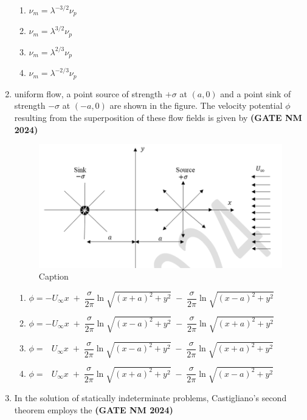 \documentclass[journal,15pt,onecolumn]{IEEEtran}
\theoremstyle{remark}
\begin{document}
\begin{enumerate}
    \begin{enumerate}
        \item $\nu_m = \lambda^{-3/2} \nu_p$
        \item $\nu_m = \lambda^{3/2} \nu_p$
        \item $\nu_m = \lambda^{2/3} \nu_p$
        \item $\nu_m = \lambda^{-2/3} \nu_p$
    \end{enumerate}
    
 \item
 uniform flow, a point source of strength $+\sigma$ at $(a,0)$ and a point sink of
  strength $-\sigma$ at $(-a,0)$ are shown in the figure. The velocity potential $\phi$
  resulting from the superposition of these flow fields is given by\hfill \textbf{ (GATE NM 2024)}

\begin{figure}
    \centering
    \includegraphics[width=0.5\linewidth]{figures.tex/Screenshot 2025-08-22 150107.png}
    \caption{Caption}
    \label{fig:placeholder}
\end{figure}
  
  \begin{enumerate}
    \item $\phi = -U_{\infty} x \;+\; \dfrac{\sigma}{2\pi}\ln\!\sqrt{(x+a)^2+y^2}
                \;-\; \dfrac{\sigma}{2\pi}\ln\!\sqrt{(x-a)^2+y^2}$
    \item $\phi = -U_{\infty} x \;+\; \dfrac{\sigma}{2\pi}\ln\!\sqrt{(x-a)^2+y^2}
                \;-\; \dfrac{\sigma}{2\pi}\ln\!\sqrt{(x+a)^2+y^2}$
    \item $\phi = \;\;\, U_{\infty} x \;+\; \dfrac{\sigma}{2\pi}\ln\!\sqrt{(x-a)^2+y^2}
                \;-\; \dfrac{\sigma}{2\pi}\ln\!\sqrt{(x+a)^2+y^2}$
    \item $\phi = \;\;\, U_{\infty} x \;+\; \dfrac{\sigma}{2\pi}\ln\!\sqrt{(x+a)^2+y^2}
                \;-\; \dfrac{\sigma}{2\pi}\ln\!\sqrt{(x-a)^2+y^2}$
  \end{enumerate}



 \item
 In the solution of statically indeterminate problems, Castigliano’s second theorem employs the\hfill \textbf{ (GATE NM 2024)}
 

\end{enumerate}
\end{document}
